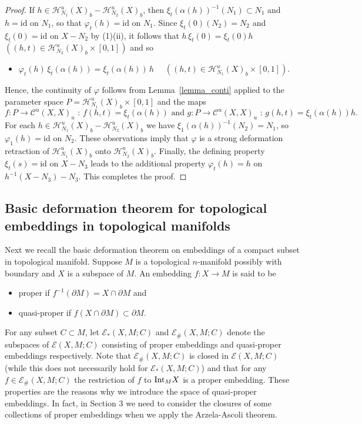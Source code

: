 \documentclass[11pt, fleqn]{amsart}
\theoremstyle{definition}
\newcommand{\cal}{\mathcal}
\renewcommand{\phi}{\varphi}
\newcommand{\lra}{\longrightarrow}
\newcommand{\id}{\mathrm{id}}
\begin{document}
\begin{proof}
\vskip 1mm 
\noindent If $h \in {\cal H}^u_{N_1}(X)_b - {\cal H}^u_{N_2}(X)_b$, then 
$\xi_t(\alpha(h))^{-1}(N_1) \subset N_1$ and $h = \id$ on $N_1$, so that $\phi_t(h) = \id$ on $N_1$. 
Since $\xi_t(0)(N_2) = N_2$ and $\xi_t(0) = \id$ on $X - N_2$ by (1)(ii), it follows that 
$h \,\xi_t(0) = \xi_t(0) h$ $((h,t) \in {\cal H}^u_{N_2}(X)_b \times [0,1])$ and so  
\begin{itemize}
\item[(2)] $\phi_t(h) \, \xi_t(\alpha(h)) = \xi_t(\alpha(h)) \, h$ \ \ $((h,t) \in {\cal H}^u_{N_1}(X)_b \times [0,1])$. 
\end{itemize}
Hence, the continuity of $\phi$ follows from Lemma~\ref{lemma_conti} 
applied to the parameter space $P = {\cal H}^u_{N_1}(X)_b \times [0,1]$ and the maps 
$$\mbox{$f : P\lra {\cal C}^u(X, X)_u$ : \ $f(h,t) = \xi_t(\alpha(h))$ \ \ and \ \ $g : P\lra {\cal C}^u(X, X)_u$ : \ $g(h, t) = \xi_t(\alpha(h)) h$.}$$ 
For each $h \in {\cal H}^u_{N_1}(X)_b - {\cal H}^u_{N_2}(X)_b$ we have 
$\xi_1(\alpha(h))^{-1}(N_2) = N_1$, so $\phi_1(h) = \id$ on $N_2$. 
These observations imply that $\phi$ is a strong deformation retraction of ${\cal H}^u_{N_1}(X)_b$ onto ${\cal H}^u_{N_2}(X)_b$.
Finally, the defining property $\xi_t(s) = \id$ on $X - N_3$ leads to the additional property 
$\phi_t(h) = h$ on $h^{-1}(X - N_3) - N_3$. 
This completes the proof. 
\end{proof}

\subsection{Basic deformation theorem for topological embeddings in topological manifolds} \mbox{} 

Next we recall the basic deformation theorem on embeddings of a compact subset in topological manifold. 
Suppose $M$ is a topological $n$-manifold possibly with boundary and $X$ is a subspace of $M$. 
An embedding $f : X \to M$ is said to be 
\begin{itemize}
\item[(i)\ ] proper if $f^{-1}(\partial M) = X \cap \partial M$ and 
\item[(ii)\,] quasi-proper if $f(X \cap \partial M) \subset \partial M$. 
\end{itemize}
For any subset $C \subset M$, let 
${\mathcal E}_\ast(X, M; C)$ and ${\mathcal E}_\#(X, M; C)$ denote the subspaces of ${\mathcal E}(X, M; C)$ consisting of proper embeddings and quasi-proper embeddings respectively. 
Note that ${\mathcal E}_\#(X, M; C)$ is closed in ${\mathcal E}(X, M; C)$ 
(while this does not necessarily hold for ${\mathcal E}_\ast(X, M; C)$) and that 
for any $f \in {\mathcal E}_\#(X, M; C)$ the restriction of $f$ to ${\rm Int}_M X$ is a proper embedding. 
These properties are the reasons why we introduce the space of quasi-proper embeddings. 
In fact, in Section 3 we need to consider the closures of 
some collections of proper embeddings when we apply the Arzela-Ascoli theorem. 
\end{document}
